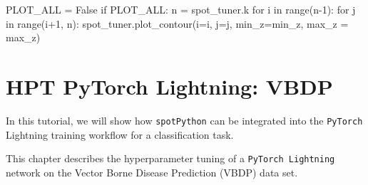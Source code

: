 \documentclass[
  letterpaper,
  DIV=11,
  numbers=noendperiod]{scrreprt}
\newenvironment{Shaded}{\begin{snugshade}}{\end{snugshade}}
\newcommand{\BuiltInTok}[1]{\textcolor[rgb]{0.00,0.23,0.31}{#1}}
\newcommand{\ControlFlowTok}[1]{\textcolor[rgb]{0.00,0.23,0.31}{#1}}
\newcommand{\DecValTok}[1]{\textcolor[rgb]{0.68,0.00,0.00}{#1}}
\newcommand{\KeywordTok}[1]{\textcolor[rgb]{0.00,0.23,0.31}{#1}}
\newcommand{\NormalTok}[1]{\textcolor[rgb]{0.00,0.23,0.31}{#1}}
\newcommand{\OperatorTok}[1]{\textcolor[rgb]{0.37,0.37,0.37}{#1}}
\newcommand{\VariableTok}[1]{\textcolor[rgb]{0.07,0.07,0.07}{#1}}
\begin{document}
\begin{Shaded}
\begin{Highlighting}[]
\NormalTok{PLOT\_ALL }\OperatorTok{=} \VariableTok{False}
\ControlFlowTok{if}\NormalTok{ PLOT\_ALL:}
\NormalTok{    n }\OperatorTok{=}\NormalTok{ spot\_tuner.k}
    \ControlFlowTok{for}\NormalTok{ i }\KeywordTok{in} \BuiltInTok{range}\NormalTok{(n}\OperatorTok{{-}}\DecValTok{1}\NormalTok{):}
        \ControlFlowTok{for}\NormalTok{ j }\KeywordTok{in} \BuiltInTok{range}\NormalTok{(i}\OperatorTok{+}\DecValTok{1}\NormalTok{, n):}
\NormalTok{            spot\_tuner.plot\_contour(i}\OperatorTok{=}\NormalTok{i, j}\OperatorTok{=}\NormalTok{j, min\_z}\OperatorTok{=}\NormalTok{min\_z, max\_z }\OperatorTok{=}\NormalTok{ max\_z)}
\end{Highlighting}
\end{Shaded}

\hypertarget{sec-hyperparameter-tuning-lightning-31}{%
\chapter{HPT PyTorch Lightning:
VBDP}\label{sec-hyperparameter-tuning-lightning-31}}

In this tutorial, we will show how \texttt{spotPython} can be integrated
into the \texttt{PyTorch} Lightning training workflow for a
classification task.

This chapter describes the hyperparameter tuning of a
\texttt{PyTorch\ Lightning} network on the Vector Borne Disease
Prediction (VBDP) data set.
\end{document}
